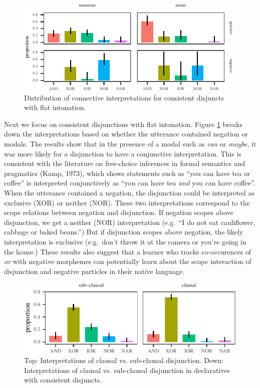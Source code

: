 \documentclass[,man,floatsintext]{apa6}
\begin{document}
\begin{figure}[tb]

{\centering \includegraphics{figs/negModalPlot-1} 

}

\caption{Distribution of connective interpretations for consistent disjuncts with flat intonation.}\label{fig:negModalPlot}
\end{figure}

Next we focus on consistent disjunctions with flat intonation. Figure \ref{fig:negModalPlot} breaks down the interpretations based on whether the utterance contained negation or modals. The results show that in the presence of a modal such as \emph{can} or \emph{maybe}, it was more likely for a disjunction to have a conjunctive interpretation. This is consistent with the literature on free-choice inferences in formal semantics and pragmatics (Kamp, 1973), which shows statements such as \enquote{you can have tea or coffee} is interpreted conjunctively as \enquote{you can have tea \emph{and} you can have coffee}. When the utterance contained a negation, the disjunction could be interpreted as exclusive (XOR) or neither (NOR). These two interpretations correspond to the scope relations between negation and disjunction. If negation scopes above disjunction, we get a neither (NOR) interpretation (e.g.~\enquote{I do not eat cauliflower, cabbage or baked beans.}) But if disjunction scopes above negation, the likely interpretation is exclusive (e.g.~don't throw it at the camera or you're going in the house.) These results also suggest that a learner who tracks co-occurences of \emph{or} with negative morphemes can potentially learn about the scope interaction of disjunction and negative particles in their native language.

\begin{figure}[tb]

{\centering \includegraphics{figs/syntaxPlot-1} 

}

\caption{Top: Interpretations of clausal vs. sub-clausal disjunction. Down: Interpretations of clausal vs. sub-clausal disjunction in declaratives with consistent disjuncts.}\label{fig:syntaxPlot}
\end{figure}
\end{document}
